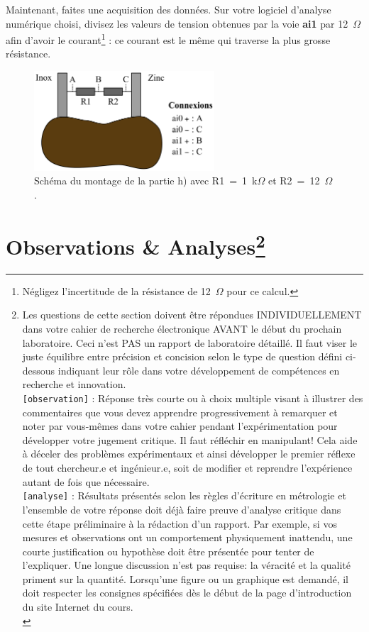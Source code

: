 \documentclass[canadien,12pt,oneside,letterpaper]{article}
\begin{document}
Maintenant, faites une acquisition des données. Sur votre logiciel d'analyse numérique choisi, divisez les valeurs de tension obtenues par la voie \textbf{ai1} par 12~$\Omega$ afin d'avoir le courant\footnote{Négligez l'incertitude de la résistance de 12~$\Omega$ pour ce calcul.} : ce courant est le même qui traverse la plus grosse résistance.

\begin{figure}[h]
\centering
\includegraphics[width=0.6\textwidth]{L1-sch-patate}
\caption{\label{L1-sch-patate}Schéma du montage de la partie h) avec R1~=~1~k$\Omega$ et R2~=~12~$\Omega$.}
\end{figure}

\section[]{Observations \& Analyses\footnote{Les questions de cette section doivent être répondues INDIVIDUELLEMENT dans votre cahier de recherche électronique AVANT le début du prochain laboratoire. Ceci n'est PAS un rapport de laboratoire détaillé. Il faut viser le juste équilibre entre précision et concision selon le type de question défini ci-dessous indiquant leur rôle dans votre développement de compétences en recherche et innovation.\\[6pt]
\texttt{[observation]} : Réponse très courte ou à choix multiple visant à illustrer des commentaires que vous devez apprendre progressivement à remarquer et noter par vous-mêmes dans votre cahier pendant l'expérimentation pour développer votre jugement critique. Il faut réfléchir en manipulant! Cela aide à déceler des problèmes expérimentaux et ainsi développer le premier réflexe de tout chercheur.e et ingénieur.e, soit de modifier et reprendre l'expérience autant de fois que nécessaire.\\[6pt]
\texttt{[analyse]} : Résultats présentés selon les règles d'écriture en métrologie et l'ensemble de votre réponse doit déjà faire preuve d'analyse critique dans cette étape préliminaire à la rédaction d'un rapport. Par exemple, si vos mesures et observations ont un comportement physiquement inattendu, une courte justification ou hypothèse doit être présentée pour tenter de l'expliquer. Une longue discussion n'est pas requise: la véracité et la qualité priment sur la quantité. Lorsqu'une figure ou un graphique est demandé, il doit respecter les consignes spécifiées dès le début de la page d'introduction du site Internet du cours.\\[-6pt]}}
\end{document}
